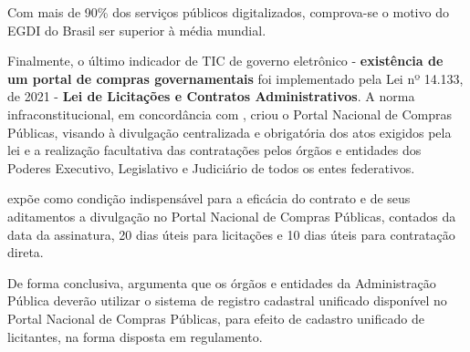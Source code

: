 Com mais de 90\% dos serviços públicos digitalizados, comprova-se o motivo do EGDI do Brasil ser superior à média mundial.

Finalmente, o último indicador de TIC de governo eletrônico - \textbf{existência de um portal de compras governamentais} foi implementado pela Lei nº 14.133, de 2021 - \textbf{Lei de Licitações e Contratos Administrativos}. A norma infraconstitucional, em concordância com \cite{l14133}, criou o Portal Nacional de Compras Públicas, visando à divulgação centralizada e obrigatória dos atos exigidos pela lei e a realização facultativa das contratações pelos órgãos e entidades dos Poderes Executivo, Legislativo e Judiciário de todos os entes federativos.

\cite{l14133} expõe como condição indispensável para a eficácia do contrato e de seus aditamentos a divulgação no Portal Nacional de Compras Públicas, contados da data da assinatura, 20 dias úteis para licitações e 10 dias úteis para contratação direta.

De forma conclusiva, \cite{l14133} argumenta que os órgãos e entidades da Administração Pública deverão utilizar o sistema de registro cadastral unificado disponível no Portal Nacional de Compras Públicas, para efeito de cadastro unificado de licitantes, na forma disposta em regulamento.
